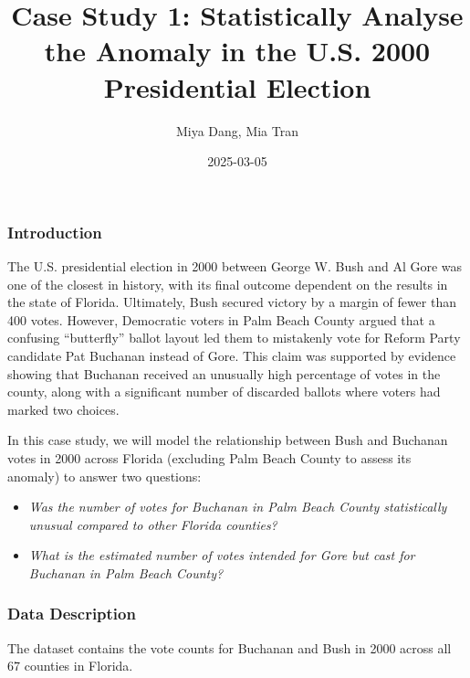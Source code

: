 \documentclass[
  letterpaper,
  DIV=11,
  numbers=noendperiod]{scrartcl}
\title{Case Study 1: Statistically Analyse the Anomaly in the U.S. 2000
Presidential Election}
\author{Miya Dang, Mia Tran}
\date{2025-03-05}
\providecommand{\tightlist}{%
  \setlength{\itemsep}{0pt}\setlength{\parskip}{0pt}}\usepackage{longtable,booktabs,array}
\begin{document}
\maketitle
\ifdefined\Shaded\renewenvironment{Shaded}{\begin{tcolorbox}[frame hidden, sharp corners, borderline west={3pt}{0pt}{shadecolor}, interior hidden, enhanced, boxrule=0pt, breakable]}{\end{tcolorbox}}\fi

\hypertarget{introduction}{%
\subsubsection{Introduction}\label{introduction}}

The U.S. presidential election in 2000 between George W. Bush and Al
Gore was one of the closest in history, with its final outcome dependent
on the results in the state of Florida. Ultimately, Bush secured victory
by a margin of fewer than 400 votes. However, Democratic voters in Palm
Beach County argued that a confusing ``butterfly'' ballot layout led
them to mistakenly vote for Reform Party candidate Pat Buchanan instead
of Gore. This claim was supported by evidence showing that Buchanan
received an unusually high percentage of votes in the county, along with
a significant number of discarded ballots where voters had marked two
choices.

In this case study, we will model the relationship between Bush and
Buchanan votes in 2000 across Florida (excluding Palm Beach County to
assess its anomaly) to answer two questions:

\begin{itemize}
\tightlist
\item
  \emph{Was the number of votes for Buchanan in Palm Beach County
  statistically unusual compared to other Florida counties?}
\item
  \emph{What is the estimated number of votes intended for Gore but cast
  for Buchanan in Palm Beach County?}
\end{itemize}

\hypertarget{data-description}{%
\subsubsection{Data Description}\label{data-description}}

The dataset contains the vote counts for Buchanan and Bush in 2000
across all 67 counties in Florida.
\end{document}
